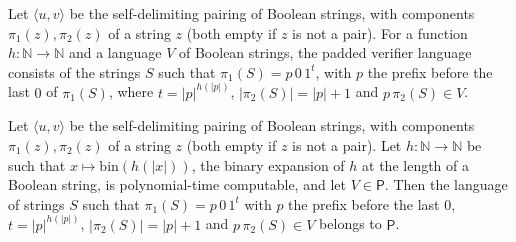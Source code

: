 \begin{definition}
\label{Complexity.ladner_verifier}
\leanok
{}
Let $\langle u,v\rangle$ be the self-delimiting pairing of Boolean strings, with components $\pi_1(z),\pi_2(z)$ of a string $z$ (both empty if $z$ is not a pair). For a function $h:\mathbb N\to\mathbb N$ and a language $V$ of Boolean strings, the padded
verifier language consists of the strings $S$ such that $\pi_1(S)=p\,0\,1^t$, with $p$ the prefix
before the last $0$ of $\pi_1(S)$, where $t=|p|^{h(|p|)}$, $|\pi_2(S)|=|p|+1$ and
$p\,\pi_2(S)\in V$.
\end{definition}

\begin{theorem}
\label{Complexity.ladner_verifier_P}
\leanok
{}
Let $\langle u,v\rangle$ be the self-delimiting pairing of Boolean strings, with components $\pi_1(z),\pi_2(z)$ of a string $z$ (both empty if $z$ is not a pair). Let $h:\mathbb N\to\mathbb N$ be such that $x\mapsto\mathrm{bin}(h(|x|))$, the binary
expansion of $h$ at the length of a Boolean string, is polynomial-time computable, and let
$V\in\mathsf P$. Then the language of strings $S$ such that $\pi_1(S)=p\,0\,1^t$ with $p$ the
prefix before the last $0$, $t=|p|^{h(|p|)}$, $|\pi_2(S)|=|p|+1$ and $p\,\pi_2(S)\in V$ belongs to
$\mathsf P$.
\end{theorem}

